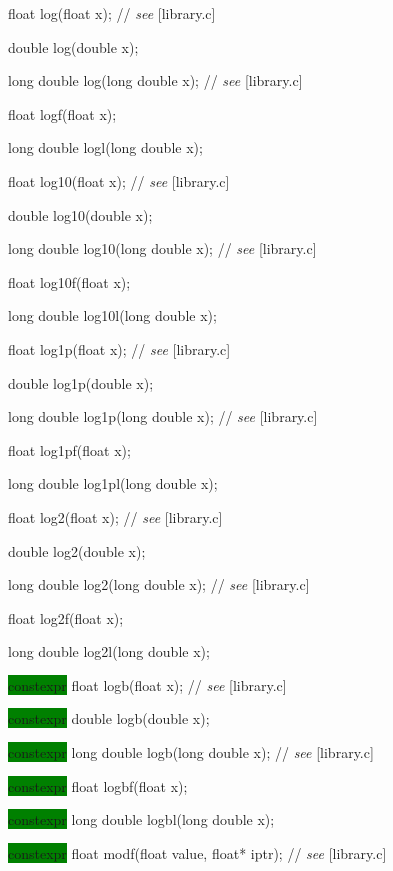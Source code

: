 \documentclass[prd,twocolumn,amsmath,amssymb,nofootinbib,eqsecnum]{revtex4-1}
\newcommand{\highlight}[1]{\colorbox{green}{\!\!\!\! #1}}
\newcommand{\stdcomment}[1]{{// {\it see} [#1]}}
\begin{document}
{\vspace{2ex}

float log(float x); \stdcomment{library.c}

double log(double x);

long double log(long double x); \stdcomment{library.c}

float logf(float x);

long double logl(long double x);

\vspace{2ex}

float log10(float x); \stdcomment{library.c}

double log10(double x);

long double log10(long double x); \stdcomment{library.c}

float log10f(float x);

long double log10l(long double x);

\vspace{2ex}

float log1p(float x); \stdcomment{library.c}

double log1p(double x);

long double log1p(long double x); \stdcomment{library.c}

float log1pf(float x);

long double log1pl(long double x);

\vspace{2ex}

float log2(float x); \stdcomment{library.c}

double log2(double x);

long double log2(long double x); \stdcomment{library.c}

float log2f(float x);

long double log2l(long double x);

\vspace{2ex}

\highlight{constexpr} float logb(float x); \stdcomment{library.c}

\highlight{constexpr} double logb(double x);

\highlight{constexpr} long double logb(long double x); \stdcomment{library.c}

\highlight{constexpr} float logbf(float x);

\highlight{constexpr} long double logbl(long double x);

\vspace{2ex}

\highlight{constexpr}  float modf(float value, float* iptr); \stdcomment{library.c}

}
\end{document}
